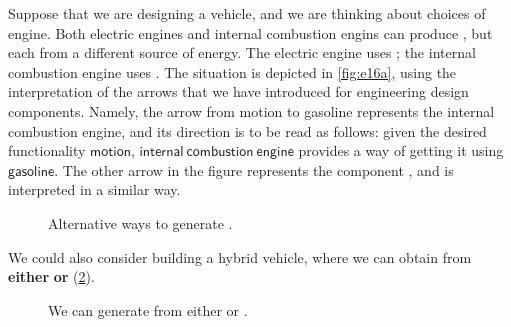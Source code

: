 \begin{example}
Suppose that we are designing a vehicle, and we are thinking about choices of engine. Both electric engines and internal combustion engins can produce , but each from a different source of energy. The electric engine uses ; the internal combustion engine uses . The situation is depicted in \cref{fig:e16a}, using the interpretation of the arrows that we have introduced for engineering design components. Namely, the arrow from motion to gasoline represents the internal combustion engine, and its direction is to be read as follows: given the desired functionality $\mathsf{motion}$, $\mathsf{internal \ combustion \ engine}$ provides a way of getting it using $\mathsf{gasoline}$. The other arrow in the figure represents the component , and is interpreted in a similar way.


\begin{figure}[h!]
    \centering
    \caption{Alternative ways to generate . \label{fig:e14}}
\end{figure}

We could also consider building a hybrid vehicle, where we can obtain  from \textbf{either}  \textbf{or}  (\cref{fig:e15}).

\begin{figure}[h!]
    \centering
    \caption{We can generate  from either  or  . \label{fig:e15}}
\end{figure}
\end{example}





